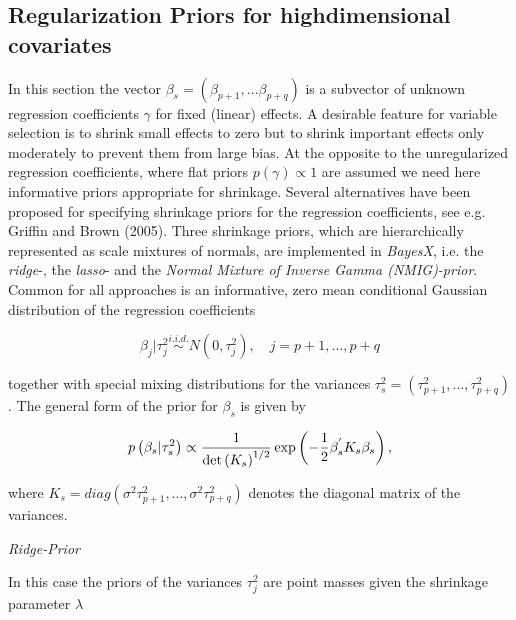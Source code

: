 \documentclass[11pt,a4paper,twoside]{bayesxarticle}
\begin{document}
\subsection{Regularization Priors for highdimensional covariates}
\label{Regularization Priors for highdimensional covariates}

In this section the vector $\beta _{s} =\left(\beta _{p+1} ,\ldots\beta _{p+q} \right)$ is a subvector of unknown regression
coefficients $\gamma $ for fixed (linear) effects. A desirable feature for variable selection is to shrink small effects to
zero but to shrink important effects only moderately to prevent them from large bias. At the opposite to the unregularized
regression coefficients, where flat priors $p \left(\gamma \right)\propto 1$ are assumed we need here informative priors
appropriate for shrinkage. Several alternatives have been proposed for specifying shrinkage priors for the regression
coefficients, see e.g. Griffin and Brown (2005). Three shrinkage priors, which are hierarchically represented as scale mixtures
of normals, are implemented in {\em BayesX}, i.e. the {\em ridge}-, the {\em lasso}- and the {\em Normal Mixture of Inverse
Gamma (NMIG)-prior}. Common for all approaches is an informative, zero mean conditional Gaussian distribution of the regression
coefficients

\[\beta _{j} |\tau _{j}^{2} \mathop{\sim }\limits^{i.i.d.} N\left(0,\tau _{j}^{2}
\right),\quad j=p+1,\ldots,p+q\]

together with special mixing distributions for the variances $\tau _{s}^{2} =\left( \tau _{p+1}^{2} ,\ldots,\tau _{p+q}^{2}
\right)$. The general form of the prior for $\beta _{s} $ is given by

\begin{equation}
\label{ZEqnNum341486}
p\left(\beta _{s} |\tau _{s}^{2} \right)\propto \frac{1}{\det \left(K_{s} \right)^{{1
\mathord{\left/ {\vphantom {1 2}} \right. \kern-\nulldelimiterspace} 2} } } \exp
\left(-\frac{1}{2} \beta _{s} ^{{'} } K_{s} \beta _{s} \right),
\end{equation}

where $K_{s} =diag\left(\sigma^2\tau _{p+1}^{2} ,\ldots,\sigma^2\tau _{p+q}^{2} \right)$ denotes the diagonal matrix of the variances.

{\em Ridge-Prior}

In this case the priors of the variances $\tau _{j}^{2} $ are point masses
given the shrinkage parameter $\lambda $
\end{document}
